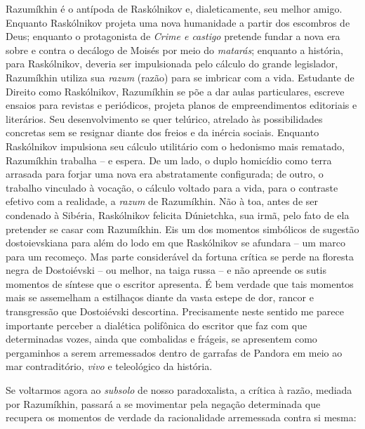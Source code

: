 Razumíkhin é o antípoda de Raskólnikov e, dialeticamente, seu melhor
amigo. Enquanto Raskólnikov projeta uma nova humanidade a partir dos
escombros de Deus; enquanto o protagonista de \emph{Crime e castigo}
pretende fundar a nova era sobre e contra o decálogo de Moisés por meio
do \emph{matarás}; enquanto a história, para Raskólnikov, deveria ser
impulsionada pelo cálculo do grande legislador, Razumíkhin utiliza sua
\emph{razum} (razão) para se imbricar com a vida. Estudante de Direito
como Raskólnikov, Razumíkhin se põe a dar aulas particulares, escreve
ensaios para revistas e periódicos, projeta planos de empreendimentos
editoriais e literários. Seu desenvolvimento se quer telúrico, atrelado
às possibilidades concretas sem se resignar diante dos freios e da
inércia sociais. Enquanto Raskólnikov impulsiona seu cálculo utilitário
com o hedonismo mais rematado, Razumíkhin trabalha -- e espera. De um
lado, o duplo homicídio como terra arrasada para forjar uma nova era
abstratamente configurada; de outro, o trabalho vinculado à vocação, o
cálculo voltado para a vida, para o contraste efetivo com a realidade, a
\emph{razum} de Razumíkhin. Não à toa, antes de ser condenado à Sibéria,
Raskólnikov felicita Dúnietchka, sua irmã, pelo fato de ela pretender se
casar com Razumíkhin. Eis um dos momentos simbólicos de sugestão
dostoievskiana para além do lodo em que Raskólnikov se afundara -- um
marco para um recomeço. Mas parte considerável da fortuna crítica se
perde na floresta negra de Dostoiévski -- ou melhor, na taiga russa -- e
não apreende os sutis momentos de síntese que o escritor apresenta. É
bem verdade que tais momentos mais se assemelham a estilhaços diante da
vasta estepe de dor, rancor e transgressão que Dostoiévski descortina.
Precisamente neste sentido me parece importante perceber a dialética
polifônica do escritor que faz com que determinadas vozes, ainda que
combalidas e frágeis, se apresentem como pergaminhos a serem
arremessados dentro de garrafas de Pandora em meio ao mar contraditório,
\emph{vivo} e teleológico da história.

Se voltarmos agora ao \emph{subsolo} de nosso paradoxalista, a crítica à
razão, mediada por Razumíkhin, passará a se movimentar pela negação
determinada que recupera os momentos de verdade da racionalidade
arremessada contra si mesma:

